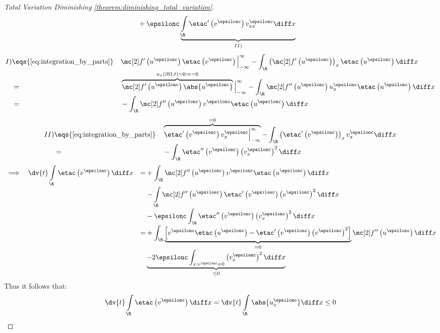 \begin{proofbox}
\begin{proof}[Total Variation Diminishing \cref{theorem:diminishing_total_variation}]
\begin{align*}
            &+\epsilonc\underbrace{\int\limits_{\R}\etac'\left(v^{\epsilonc}\right)v_{xx}^{\epsilonc}\diff x}_{II)}
        \end{align*}
        \begin{alignat*}{3}
            I)&\eqs{\cref{eq:integration_by_parts}}&&\flux' \left(u^{\epsilonc}\right)\etac \left(v^{\epsilonc}\right)\Big|_{-\infty}^{\infty}
            -\int_{\R}\left(\flux'\left(u^{\epsilonc}\right)\right)_{x}\etac\left(u^{\epsilonc}\right)\diff x \\[-1\jot]
        &=&&\overbrace{\flux' \left(u^{\epsilonc}\right)\abs{u^{\epsilonc}}}^{u_{x}(\partial\Omega, t)=0\Rightarrow=0}\Big|_{-\infty}^{\infty}
            -\int_{\R}\flux''\left(u^{\epsilonc}\right)u_{x}^{\epsilonc}\etac\left(u^{\epsilonc}\right)\diff x \\[-1\jot]
        &=&&-\int_{\R}\flux''\left(u^{\epsilonc}\right)v^{\epsilonc}\etac\left(u^{\epsilonc}\right)\diff x
        \end{alignat*}
        \begin{alignat*}{3}
            II)&\eqs{\cref{eq:integration_by_parts}}&&\overbrace{\etac'\left(v^{\epsilonc}\right)v_{x}^{\epsilonc}\Big|_{-\infty}^{\infty}}^{=0}
            -\int_{\R}\left(\etac'\left(v^{\epsilonc}\right)\right)_{x}v_{x}^{\epsilonc}\diff x \\[-1\jot]
        &=&&-\int_{\R}\etac''\left(v^{\epsilonc}\right)\left(v_{x}^{\epsilonc}\right)^{2}\diff x
        \end{alignat*}
        \begin{alignat*}{5}
            &\implies&&
          \dv{t}\int\limits_{\R}\etac\left(v^{\epsilonc}\right)\diff x&=&
            +\int_{\R}\flux''\left(u^{\epsilonc}\right)v^{\epsilonc}\etac\left(u^{\epsilonc}\right)\diff x \\[-1\jot]
            &&&&&-\int\limits_{\R}\flux''\left(u^{\epsilonc}\right)\etac'\left(v^{\epsilonc}\right)\left(v^{\epsilonc}\right)^{2}\diff x\\[-1\jot]
            &&&&&-\epsilonc\int_{\R}\etac''\left(v^{\epsilonc}\right)\left(v_{x}^{\epsilonc}\right)^{2}\diff x \\[-1\jot]
            &&&&=&+\int_{\R}\underbrace{\left[v^{\epsilonc}\etac\left(u^{\epsilonc}\right)-\etac'\left(v^{\epsilonc}\right)\left(v^{\epsilonc}\right)^{2}\right]}_{=0}\flux''\left(u^{\epsilonc}\right)\diff x \\[-1\jot]
            &&&&&\underbrace{-2\epsilonc\int_{x:v^{\epsilonc}=0}\left(v_{x}^{\epsilonc}\right)^{2}\diff x}_{\leq 0}
        \end{alignat*}
        Thus it follows that:
        \begin{align*}
            \dv{t}\int\limits_{\R}\etac\left(v^{\epsilonc}\right)\diff x=\dv{t}\int\limits_{\R}\abs{u_{x}^{\epsilonc}}\diff x\leq0
        \end{align*}
    \end{proof}
\end{proofbox}
